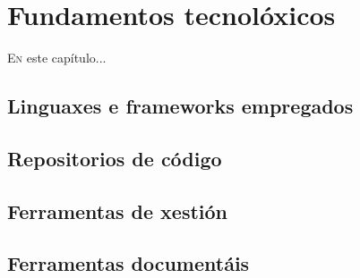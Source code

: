\chapter{Fundamentos tecnolóxicos}
\minitoc
\label{chap:Fundamentostecnoloxicos}
\vspace{0.5cm}


  \lettrine{E}{n} este capítulo...

  \section{Linguaxes e frameworks empregados}
  \section{Repositorios de código}
  \section{Ferramentas de xestión}
  \section{Ferramentas documentáis}

